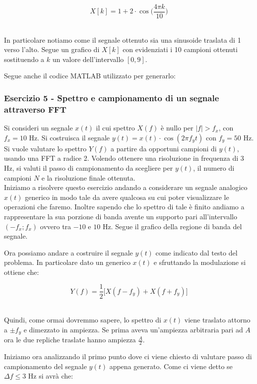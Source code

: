 \documentclass[../main.tex]{subfiles}
\begin{document}
\[X[k] = 1 + 2 \cdot \cos\bigg(\frac{4\pi k}{10}\bigg)\]\

In particolare notiamo come il segnale ottenuto sia una sinusoide traslata di 1 verso l'alto.
Segue un grafico di $X[k]$ con evidenziati i 10 campioni ottenuti sostituendo a $k$ un valore dell'intervallo $[0,9].$


Segue anche il codice MATLAB utilizzato per generarlo:



\subsubsection{Esercizio 5 - Spettro e campionamento di un segnale attraverso FFT}

Si consideri un segnale $x(t)$ il cui spettro $X(f)$ è nullo per $|f| > f_x$, con $f_x = 10$ Hz. Si costruisca il segnale $y(t) = x(t) \cdot \cos(2\pi f_y t)$ con $f_y = 50$ Hz. Si vuole valutare lo spettro $Y(f)$ a partire da opportuni campioni di $y(t)$, usando una FFT a radice 2. Volendo ottenere una risoluzione in frequenza di 3 Hz, si valuti il passo di campionamento da scegliere per $y(t)$, il numero di campioni $N$ e la risoluzione finale ottenuta.\\

Iniziamo a risolvere questo esercizio andando a considerare un segnale analogico $x(t)$ generico in modo tale da avere qualcosa su cui poter visualizzare le operazioni che faremo.
Inoltre sapendo che lo spettro di tale è finito andiamo a rappresentare la sua porzione di banda avente un supporto pari all'intervallo $(-f_x;f_x)$ ovvero tra $-10$ e $10$ Hz.
Segue il grafico della regione di banda del segnale.

Ora possiamo andare a costruire il segnale $y(t)$ come indicato dal testo del problema. In particolare dato un generico $x(t)$ e sfruttando la modulazione si ottiene che:

\[ Y(f) = \frac{1}{2} \bigg[ X(f - f_y) + X(f + f_y) \bigg]  \]\

Quindi, come ormai dovremmo sapere, lo spettro di $x(t)$ viene traslato attorno a $\pm f_y$ e dimezzato in ampiezza. Se prima aveva un'ampiezza arbitraria pari ad $A$ ora le due repliche traslate hanno ampiezza $\tfrac{A}{2}$.

Iniziamo ora analizzando il primo punto dove ci viene chiesto di valutare passo di campionamento del segnale $y(t)$ appena generato. 
Come ci viene detto se $\Delta f \leq 3$ Hz si avrà che:
\end{document}
